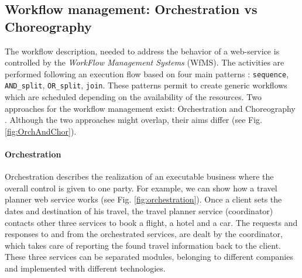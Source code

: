\subsection{Workflow management: Orchestration vs Choreography}
\label{WFManagement}
The workflow description, needed to address the behavior of a web-service is controlled by the \textit{WorkFlow Management Systems} (WfMS). The activities are performed following an execution flow based on four main patterns \cite{Pernici04}: \verb|sequence|, \verb|AND_split|, \verb|OR_split|, \verb|join|. These patterns permit to create generic workflows which are scheduled depending on the availability of the resources.
Two approaches for the workflow management exist: Orchestration and Choreography \cite{Peltz03}. Although the two approaches might overlap, their aims differ (see Fig. \ref{fig:OrchAndChor}). 

\paragraph{Orchestration}
Orchestration describes the realization of an executable business where the overall control is given to one party. For example, we can show how a travel planner web service works (see Fig. \ref{fig:orchestration}). Once a client sets the dates and destination of his travel, the travel planner service (coordinator) contacts other three services to book a flight, a hotel and a car. The requests and responses to and from the orchestrated services, are dealt by the coordinator, which takes care of reporting the found travel information back to the client.
These three services can be separated modules, belonging to different companies and implemented with different technologies.
